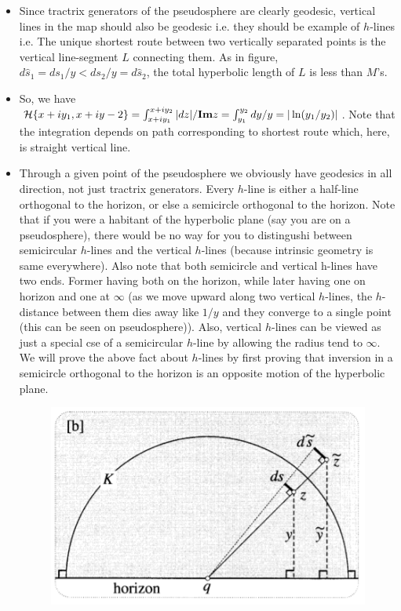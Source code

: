 \documentclass[12pt]{article}
\def\mc{\ensuremath\mathcal}
\def\mf{\ensuremath\mathbf}
\begin{document}
\begin{itemize}
    \item Since tractrix generators of the pseudosphere are clearly geodesic, vertical lines in the map should also be geodesic i.e. they should be example of $h$-lines i.e. The unique shortest route between two vertically separated points is the vertical line-segment $L$ connecting them. As in figure, $d\hat{s}_1 = ds_1/y < ds_2/y = d\hat{s}_2$, the total hyperbolic length of $L$ is less than $M$'s.

    \item So, we have $\mc{H}\{x+iy_1,x+iy-2\} = \int_{x+iy_1}^{x+iy_2}|dz|/\mf{Im}z = \int_{y_1}^{y_2}dy/y = |\ln(y_1/y_2)|$. Note that the integration depends on path corresponding to shortest route which, here, is straight vertical line.

    \item Through a given point of the pseudosphere we obviously have geodesics in all direction, not just tractrix generators. Every $h$-line is either a half-line orthogonal to the horizon, or else a semicircle orthogonal to the horizon. Note that if you were a habitant of the hyperbolic plane (say you are on a pseudosphere), there would be no way for you to distingushi between semicircular $h$-lines and the vertical $h$-lines (because intrinsic geometry is same everywhere). Also note that both semicircle and vertical h-lines have two ends. Former having both on the horizon, while later having one on horizon and one at $\infty$ (as we move upward along two vertical $h$-lines, the $h$-distance between them dies away like $1/y$ and they converge to a single point (this can be seen on pseudosphere)). Also, vertical $h$-lines can be viewed as just a special cse of a semicircular $h$-line by allowing the radius tend to $\infty$. We will prove the above fact about $h$-lines by first proving that inversion in a semicircle orthogonal to the horizon is an opposite motion of the hyperbolic plane.

    \begin{figure}[h!]
        \centering
        \includegraphics[scale=0.7]{fig_16}
        \label{fig_16}
    \end{figure}


\end{itemize}
\end{document}
